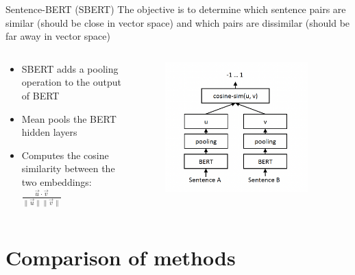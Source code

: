 \documentclass{beamer}
\begin{document}
\begin{frame}{Sentence-BERT (SBERT)\cite{sbert}}
  The objective is to determine which sentence pairs are similar (should be close in vector space) and which pairs are dissimilar (should be far away in vector space)
  \begin{columns}
    \begin{column}{0.4\textwidth}
     \begin{itemize}
      \item SBERT adds a pooling operation to the output of BERT
      \item Mean pools the BERT hidden layers
      \item Computes the cosine similarity between the two embeddings: $\frac{\vec{u} \cdot \vec{v}}{\|\vec{u}\|\|\vec{v}\|}$
     \end{itemize}
    \end{column}
    \begin{column}{0.6\textwidth}
        \begin{figure}[ht!]
          \centering
          \includegraphics[width=0.9\textwidth]{images/sbert_arch.png}
      \end{figure}     
    \end{column}
  \end{columns}
\end{frame}


\section{Comparison of methods}
\end{document}
